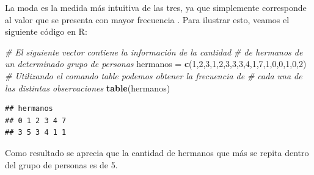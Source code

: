 \documentclass[
  11pt,
]{book}
\newenvironment{Shaded}{\begin{snugshade}}{\end{snugshade}}
\newcommand{\CommentTok}[1]{\textcolor[rgb]{0.56,0.35,0.01}{\textit{#1}}}
\newcommand{\DecValTok}[1]{\textcolor[rgb]{0.00,0.00,0.81}{#1}}
\newcommand{\FunctionTok}[1]{\textcolor[rgb]{0.13,0.29,0.53}{\textbf{#1}}}
\newcommand{\NormalTok}[1]{#1}
\newcommand{\OtherTok}[1]{\textcolor[rgb]{0.56,0.35,0.01}{#1}}
\theoremstyle{definition}
\theoremstyle{definition}
\theoremstyle{definition}
\theoremstyle{definition}
\theoremstyle{remark}
\begin{document}
La moda es la medida más intuitiva de las tres, ya que simplemente corresponde al valor que se presenta con mayor frecuencia \citep[página 85]{anderson}. Para ilustrar esto, veamos el siguiente código en R:

\begin{Shaded}
\begin{Highlighting}[]
\CommentTok{\# El siguiente vector contiene la información de la cantidad }
\CommentTok{\# de hermanos de un determinado grupo de personas}
\NormalTok{hermanos }\OtherTok{=} \FunctionTok{c}\NormalTok{(}\DecValTok{1}\NormalTok{,}\DecValTok{2}\NormalTok{,}\DecValTok{3}\NormalTok{,}\DecValTok{1}\NormalTok{,}\DecValTok{2}\NormalTok{,}\DecValTok{3}\NormalTok{,}\DecValTok{3}\NormalTok{,}\DecValTok{3}\NormalTok{,}\DecValTok{4}\NormalTok{,}\DecValTok{1}\NormalTok{,}\DecValTok{7}\NormalTok{,}\DecValTok{1}\NormalTok{,}\DecValTok{0}\NormalTok{,}\DecValTok{0}\NormalTok{,}\DecValTok{1}\NormalTok{,}\DecValTok{0}\NormalTok{,}\DecValTok{2}\NormalTok{)}
\CommentTok{\# Utilizando el comando table podemos obtener la frecuencia de }
\CommentTok{\# cada una de las distintas observaciones}
\FunctionTok{table}\NormalTok{(hermanos)}
\end{Highlighting}
\end{Shaded}

\begin{verbatim}
## hermanos
## 0 1 2 3 4 7 
## 3 5 3 4 1 1
\end{verbatim}

Como resultado se aprecia que la cantidad de hermanos que más se repita dentro del grupo de personas es de 5.
\end{document}
